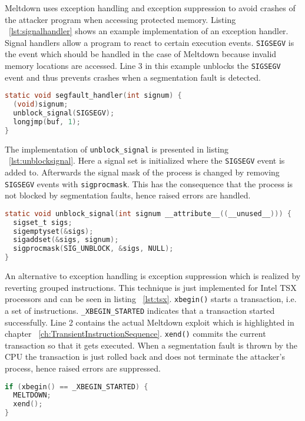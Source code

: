 \documentclass[a4paper,oneside,openright] {scrreprt}
\begin{document}
Meltdown uses exception handling and exception suppression to avoid crashes of the attacker program when accessing protected memory.
Listing ~\ref{lst:signalhandler} shows an example implementation of an exception handler.
Signal handlers allow a program to react to certain execution events. 
\texttt{SIGSEGV} is the event which should be handled in the case of Meltdown because invalid memory locations are accessed.
Line 3 in this example unblocks the \texttt{SIGSEGV} event and thus prevents crashes when a segmentation fault is detected.

\begin{lstlisting}[language=C, caption=Meltdown: Exception Handling 1, label={lst:signalhandler}]
static void segfault_handler(int signum) {
  (void)signum;
  unblock_signal(SIGSEGV);
  longjmp(buf, 1);
}
\end{lstlisting}

The implementation of \texttt{unblock\_signal} is presented in listing ~\ref{lst:unblocksignal}. 
Here a signal set is initialized where the \texttt{SIGSEGV} event is added to.
Afterwards the signal mask of the process is changed by removing \texttt{SIGSEGV} events with \texttt{sigprocmask}.
This has the consequence that the process is not blocked by segmentation faults, hence raised errors are handled.

\begin{lstlisting}[language=C, caption=Meltdown: Exception Handling 2, label={lst:unblocksignal}]
static void unblock_signal(int signum __attribute__((__unused__))) {
  sigset_t sigs;
  sigemptyset(&sigs);
  sigaddset(&sigs, signum);
  sigprocmask(SIG_UNBLOCK, &sigs, NULL);
}
\end{lstlisting}

An alternative to exception handling is exception suppression which is realized by reverting grouped instructions.
This technique is just implemented for Intel TSX processors and can be seen in listing ~\ref{lst:tsx}.
\texttt{xbegin()} starts a transaction, i.e. a set of instructions.
\texttt{\_XBEGIN\_STARTED} indicates that a transaction started successfully.
Line 2 contains the actual Meltdown exploit which is highlighted in chapter ~\ref{ch:TransientInstructionSequence}.
\texttt{xend()} commits the current transaction so that it gets executed.
When a segmentation fault is thrown by the CPU the transaction is just rolled back and does not terminate the attacker's process,
hence raised errors are suppressed.

\begin{lstlisting}[language=C, caption=Meltdown: Exception Suppression on Intel TSX, label={lst:tsx}]
if (xbegin() == _XBEGIN_STARTED) {
  MELTDOWN;
  xend();
}
\end{lstlisting}
\end{document}
